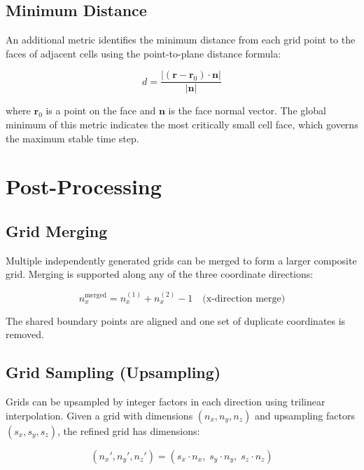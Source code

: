 \documentclass[11pt,a4paper]{report}
\newcommand{\rvec}{\bm{r}}
\newcommand{\nvec}{\bm{n}}
\begin{document}
\section{Minimum Distance}

An additional metric identifies the minimum distance from each grid point to the faces of adjacent cells using the point-to-plane distance formula:

\begin{equation}
    d = \frac{|(\rvec - \rvec_0) \cdot \nvec|}{|\nvec|}
\end{equation}

where $\rvec_0$ is a point on the face and $\nvec$ is the face normal vector. The global minimum of this metric indicates the most critically small cell face, which governs the maximum stable time step.

\chapter{Post-Processing}

\section{Grid Merging}

Multiple independently generated grids can be merged to form a larger composite grid. Merging is supported along any of the three coordinate directions:

\begin{equation}
    n_x^{\text{merged}} = n_x^{(1)} + n_x^{(2)} - 1 \quad \text{(x-direction merge)}
\end{equation}

The shared boundary points are aligned and one set of duplicate coordinates is removed.

\section{Grid Sampling (Upsampling)}

Grids can be upsampled by integer factors in each direction using trilinear interpolation. Given a grid with dimensions $(n_x, n_y, n_z)$ and upsampling factors $(s_x, s_y, s_z)$, the refined grid has dimensions:

\begin{equation}
    (n_x', n_y', n_z') = (s_x \cdot n_x, \; s_y \cdot n_y, \; s_z \cdot n_z)
\end{equation}
\end{document}
